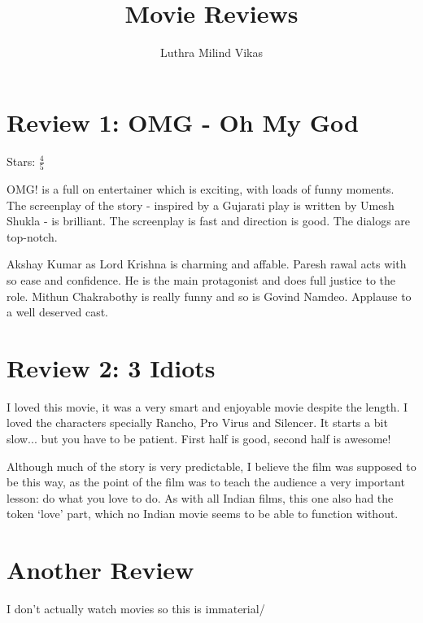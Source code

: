 \documentclass{article}
\author{Luthra Milind Vikas}
\date{}
\title{Movie Reviews}
\begin{document}
\maketitle

\section{Review 1: OMG - Oh My God}

Stars: $\frac{4}{5}$



OMG! is a full on entertainer which is exciting, with loads of funny moments. The screenplay of the story - inspired by a Gujarati play is written by Umesh Shukla - is brilliant. The screenplay is fast and direction is good. The dialogs are top-notch.

Akshay Kumar as Lord Krishna is charming and affable. Paresh rawal acts with so ease and confidence. He is the main protagonist and does full justice to the role. Mithun Chakrabothy is really funny and so is Govind Namdeo. Applause to a well deserved cast.


\section{Review 2: 3 Idiots}

I loved this movie, it was a very smart and enjoyable movie despite the length. I loved the characters specially Rancho, Pro Virus and Silencer. It starts a bit slow... but you have to be patient. First half is good, second half is awesome!

Although much of the story is very predictable, I believe the film was supposed to be this way, as the point of the film was to teach the audience a very important lesson: do what you love to do. As with all Indian films, this one also had the token `love' part, which no Indian movie seems to be able to function without.

\section{Another Review}

I don't actually watch movies so this is immaterial/


\end{document}
